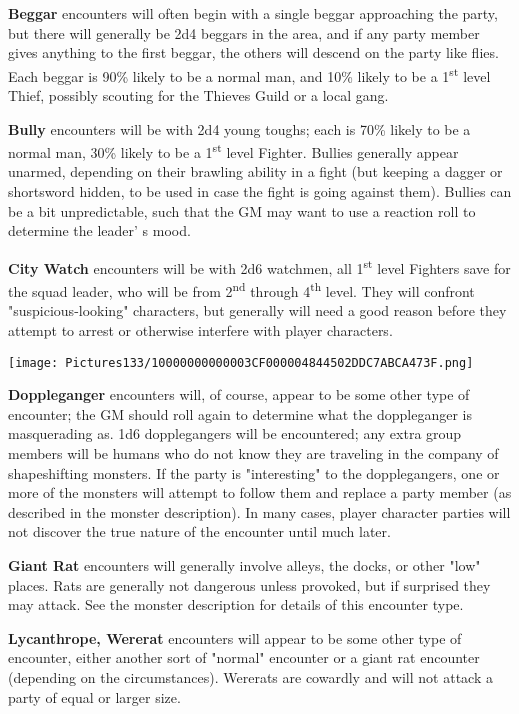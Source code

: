 \documentclass[a4paper,twoside,openany,10pt]{book}
\begin{document}
\begin{multicols}{2}
\textbf{Beggar} encounters will often begin with a single beggar approaching the party, but there will generally be 2d4 beggars in the area, and if any party member gives anything to the first beggar, the others will descend on the party like flies. Each beggar is 90\% likely to be a normal man, and 10\% likely to be a 1\textsuperscript{st} level Thief, possibly scouting for the Thieves Guild or a local gang.


\textbf{Bully} encounters will be with 2d4 young toughs; each is 70\% likely to be a normal man, 30\% likely to be a 1\textsuperscript{st} level Fighter. Bullies generally appear unarmed, depending on their brawling ability in a fight (but keeping a dagger or shortsword hidden, to be used in case the fight is going against them). Bullies can be a bit unpredictable, such that the GM may want to use a reaction roll to determine the leader' s mood.

\textbf{City Watch }encounters will be with 2d6 watchmen, all 1\textsuperscript{st} level Fighters save for the squad leader, who will be from 2\textsuperscript{nd} through 4\textsuperscript{th} level. They will confront "suspicious-looking" characters, but generally will need a good reason before they attempt to arrest or otherwise interfere with player characters.


\begin{flushleft} \texttt{[image: Pictures133/10000000000003CF000004844502DDC7ABCA473F.png]}  \end{flushleft}

\textbf{Doppleganger} encounters will, of course, appear to be some other type of encounter; the GM should roll again to determine what the doppleganger is masquerading as. 1d6 dopplegangers will be encountered; any extra group members will be humans who do not know they are traveling in the company of shapeshifting monsters. If the party is "interesting" to the dopplegangers, one or more of the monsters will attempt to follow them and replace a party member (as described in the monster description). In many cases, player character parties will not discover the true nature of the encounter until much later. 

\textbf{Giant Rat} encounters will generally involve alleys, the docks, or other "low" places. Rats are generally not dangerous unless provoked, but if surprised they may attack. See the monster description for details of this encounter type.

\textbf{Lycanthrope, Wererat} encounters will appear to be some other type of encounter, either another sort of "normal" encounter or a giant rat encounter (depending on the circumstances). Wererats are cowardly and will not attack a party of equal or larger size.


\end{multicols}
\end{document}
